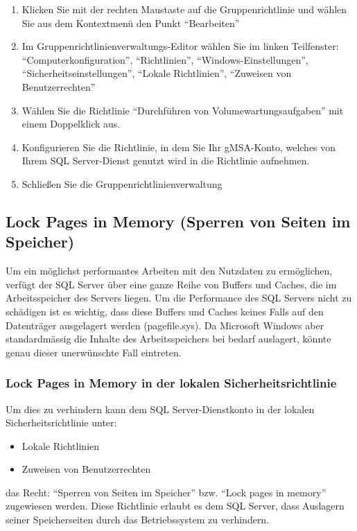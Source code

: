 \begin{enumerate}
\clearpage
              \item Klicken Sie mit der rechten Maustaste auf die
              Gruppenrichtlinie und wählen Sie aus dem Kontextmenü den Punkt 
              \enquote{Bearbeiten}
              \item Im Gruppenrichtlinienverwaltungs-Editor wählen Sie im linken
              Teilfenster: \enquote{Computerkonfiguration}, \enquote{Richtlinien},
              \enquote{Windows-Einstellungen}, \enquote{Sicherheitseinstellungen},
              \enquote{Lokale Richtlinien}, \enquote{Zuweisen von Benutzerrechten}
              \item Wählen Sie die Richtlinie \enquote{Durchführen von
              Volumewartungsaufgaben} mit einem Doppelklick aus.
\clearpage
              \item Konfigurieren Sie die Richtlinie, in dem Sie Ihr gMSA-Konto,
              welches von Ihrem SQL Server-Dienst genutzt wird in die Richtlinie
              aufnehmen.
              \item Schließen Sie die Gruppenrichtlinienverwaltung
          \end{enumerate}
      \subsection{Lock Pages in Memory (Sperren von Seiten im Speicher)}
        Um ein möglichst performantes Arbeiten mit den Nutzdaten zu ermöglichen,
        verfügt der SQL Server über eine ganze Reihe von Buffers und Caches, die
        im Arbeitsspeicher des Servers liegen. Um die Performance des SQL Servers
        nicht zu schädigen ist es wichtig, dass diese Buffers und Caches keines
        Falls auf den Datenträger ausgelagert werden (pagefile.sys). Da Microsoft
        Windows aber standardmässig die Inhalte des Arbeitsspeichers bei bedarf
        auslagert, könnte genau dieser unerwünschte Fall eintreten.
        \subsubsection{Lock Pages in Memory in der lokalen Sicherheitsrichtlinie}
          Um dies zu verhindern kann dem SQL Server-Dienstkonto in der
          lokalen Sicherheitsrichtlinie unter:
        \begin{itemize}
            \item Lokale Richtlinien
            \item Zuweisen von Benutzerrechten
        \end{itemize}
        das Recht: \enquote{Sperren von Seiten im Speicher} bzw. \enquote{Lock
        pages in memory} zugewiesen werden. Diese Richtlinie erlaubt es dem SQL
        Server, dass Auslagern seiner Speicherseiten durch das Betriebssystem zu
        verhindern.
